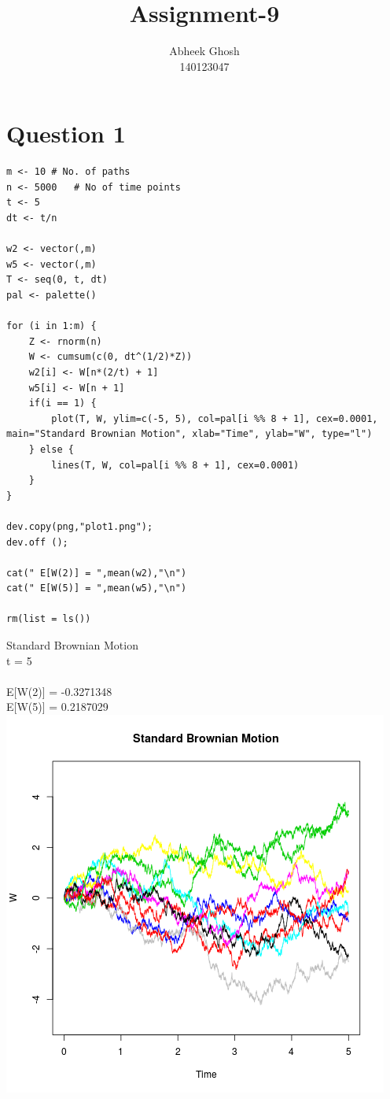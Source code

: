 \documentclass{article}
\begin{document}
	\title{\textbf{Assignment-9}}
	\author{Abheek Ghosh \\ 
		140123047 }
	
	\maketitle
	

\section{Question 1}


\begin{lstlisting}
m <- 10	# No. of paths
n <- 5000	# No of time points
t <- 5
dt <- t/n

w2 <- vector(,m)
w5 <- vector(,m)
T <- seq(0, t, dt)
pal <- palette()

for (i in 1:m) {
	Z <- rnorm(n)
	W <- cumsum(c(0, dt^(1/2)*Z))
	w2[i] <- W[n*(2/t) + 1]
	w5[i] <- W[n + 1]
	if(i == 1) {
		plot(T, W, ylim=c(-5, 5), col=pal[i %% 8 + 1], cex=0.0001, main="Standard Brownian Motion", xlab="Time", ylab="W", type="l")
	} else {
		lines(T, W, col=pal[i %% 8 + 1], cex=0.0001)
	}
}

dev.copy(png,"plot1.png");
dev.off ();

cat(" E[W(2)] = ",mean(w2),"\n")
cat(" E[W(5)] = ",mean(w5),"\n")

rm(list = ls())
\end{lstlisting}
Standard Brownian Motion \\
t = 5\\\\
 E[W(2)] =  -0.3271348 \\
 E[W(5)] =  0.2187029 \\

\includegraphics{"plot1"}
\pagebreak
\end{document}
